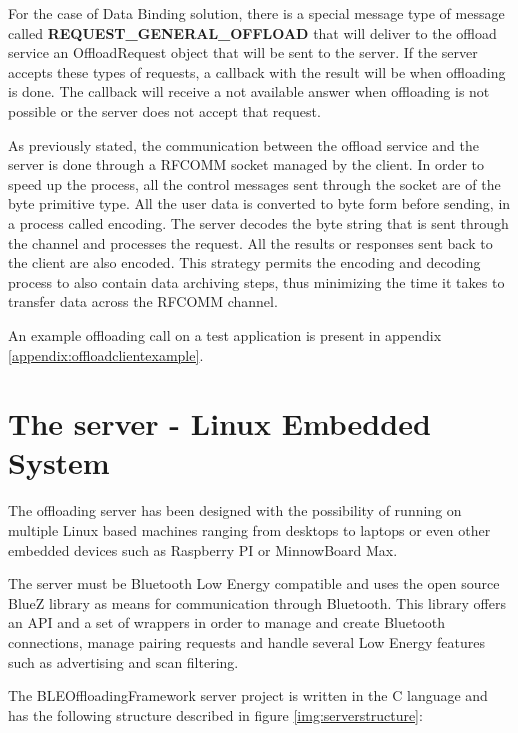 For the case of Data Binding solution, there is a special message type of message called \textbf{REQUEST_GENERAL_OFFLOAD} that will deliver to the offload service an OffloadRequest object that will be sent to the server. If the server accepts these types of requests, a callback with the result will be when offloading is done. The callback will receive a not available answer when offloading is not possible or the server does not accept that request.

As previously stated, the communication between the offload service and the server is done through a RFCOMM socket managed by the client. In order to speed up the process, all the control messages sent through the socket are of the byte primitive type. All the user data is converted to byte form before sending, in a process called encoding. The server decodes the byte string that is sent through the channel and processes the request. All the results or responses sent back to the client are also encoded. This strategy permits the encoding and decoding process to also contain data archiving steps, thus minimizing the time it takes to transfer data across the RFCOMM channel.

An example offloading call on a test application is present in appendix \ref{appendix:offloadclientexample}.

\pagebreak

\section{The server - Linux Embedded System}

The offloading server has been designed with the possibility of running on multiple Linux based machines ranging from desktops to laptops or even other embedded devices such as Raspberry PI or MinnowBoard Max.

The server must be Bluetooth Low Energy compatible and uses the open source BlueZ\cite{holtmann2007bluez} library as means for communication through Bluetooth. This library offers an API and a set of wrappers in order to manage and create Bluetooth connections, manage pairing requests and handle several Low Energy features such as advertising and scan filtering.

The BLEOffloadingFramework server project is written in the C language and has the following structure described in figure \ref{img:serverstructure}:


